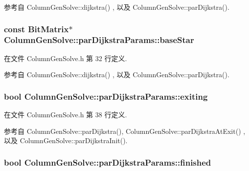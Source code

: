 参考自 Column\+Gen\+Solve\+::dijkstra() , 以及 Column\+Gen\+Solve\+::par\+Dijkstra().

\subsubsection[{\texorpdfstring{base\+Star}{baseStar}}]{\setlength{\rightskip}{0pt plus 5cm}const {\bf Bit\+Matrix}$\ast$ Column\+Gen\+Solve\+::par\+Dijkstra\+Params\+::base\+Star}\hypertarget{structColumnGenSolve_1_1parDijkstraParams_a6d66ec75238960aaf04d2d62058ea077}{}\label{structColumnGenSolve_1_1parDijkstraParams_a6d66ec75238960aaf04d2d62058ea077}


在文件 Column\+Gen\+Solve.\+h 第 32 行定义.



参考自 Column\+Gen\+Solve\+::dijkstra() , 以及 Column\+Gen\+Solve\+::par\+Dijkstra().

\subsubsection[{\texorpdfstring{exiting}{exiting}}]{\setlength{\rightskip}{0pt plus 5cm}bool Column\+Gen\+Solve\+::par\+Dijkstra\+Params\+::exiting}\hypertarget{structColumnGenSolve_1_1parDijkstraParams_a56efc1b9b760d7a8934f06406e2e61a0}{}\label{structColumnGenSolve_1_1parDijkstraParams_a56efc1b9b760d7a8934f06406e2e61a0}


在文件 Column\+Gen\+Solve.\+h 第 38 行定义.



参考自 Column\+Gen\+Solve\+::par\+Dijkstra(), Column\+Gen\+Solve\+::par\+Dijkstra\+At\+Exit() , 以及 Column\+Gen\+Solve\+::par\+Dijkstra\+Init().

\subsubsection[{\texorpdfstring{finished}{finished}}]{\setlength{\rightskip}{0pt plus 5cm}bool Column\+Gen\+Solve\+::par\+Dijkstra\+Params\+::finished}\hypertarget{structColumnGenSolve_1_1parDijkstraParams_a72bfc9f9b0c4851bdb63715b053df511}{}\label{structColumnGenSolve_1_1parDijkstraParams_a72bfc9f9b0c4851bdb63715b053df511}


